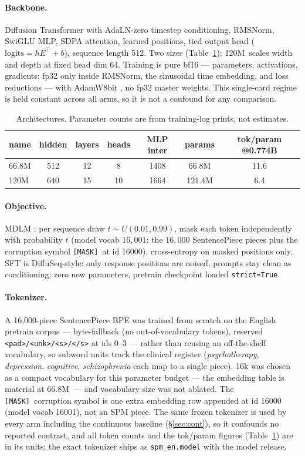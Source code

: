 \documentclass[11pt]{article}
\newcommand{\MASK}{\texttt{[MASK]}}
\newcommand{\repo}[1]{\texttt{\footnotesize #1}}
\newcommand{\sixsix}{66.8M}
\newcommand{\onetwenty}{120M}
\begin{document}
\paragraph{Backbone.} Diffusion Transformer with AdaLN-zero timestep conditioning, RMSNorm, SwiGLU MLP, SDPA attention, learned positions, tied output head ($\mathrm{logits}=hE^{\top}+b$), sequence length 512. Two sizes (Table~\ref{tab:arch}); \onetwenty\ scales width and depth at fixed head dim 64. Training is pure bf16 --- parameters, activations, gradients; fp32 only inside RMSNorm, the sinusoidal time embedding, and loss reductions --- with AdamW8bit \citep{dettmers2022adamw8bit}, no fp32 master weights. This single-card regime is held constant across all arms, so it is not a confound for any comparison.

\begin{table}[h]\centering\small
\caption{Architectures. Parameter counts are from training-log prints, not estimates.}
\label{tab:arch}
\begin{tabular}{lcccccc}
\toprule
name & hidden & layers & heads & MLP inter & params & tok/param @0.774B \\
\midrule
\sixsix    & 512 & 12 & 8  & 1408 & 66.8M  & 11.6 \\
\onetwenty & 640 & 15 & 10 & 1664 & 121.4M & 6.4 \\
\bottomrule
\end{tabular}
\end{table}

\paragraph{Objective.} MDLM \citep{sahoo2024mdlm}: per sequence draw $t\sim U(0.01,0.99)$, mask each token independently with probability $t$ (model vocab $16{,}001$: the $16{,}000$ SentencePiece pieces plus the corruption symbol \MASK\ at id 16000), cross-entropy on masked positions only. SFT is DiffuSeq-style: only response positions are noised, prompts stay clean as conditioning; zero new parameters, pretrain checkpoint loaded \texttt{strict=True}.

\paragraph{Tokenizer.} A 16{,}000-piece SentencePiece BPE was trained from scratch on the English pretrain corpus --- byte-fallback (no out-of-vocabulary tokens), reserved \texttt{<pad>/<unk>/<s>/</s>} at ids 0--3 --- rather than reusing an off-the-shelf vocabulary, so subword units track the clinical register (\emph{psychotherapy}, \emph{depression}, \emph{cognitive}, \emph{schizophrenia} each map to a single piece). 16k was chosen as a compact vocabulary for this parameter budget --- the embedding table is material at \sixsix\ --- and vocabulary size was not ablated. The \MASK\ corruption symbol is one extra embedding row appended at id 16000 (model vocab 16001), not an SPM piece. The same frozen tokenizer is used by every arm including the continuous baseline (\S\ref{sec:cont}), so it confounds no reported contrast, and all token counts and the tok/param figures (Table~\ref{tab:arch}) are in its units; the exact tokenizer ships as \repo{spm\_en.model} with the model release.
\end{document}

